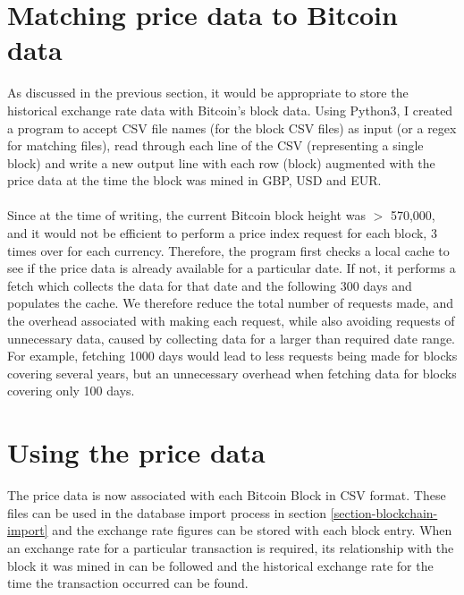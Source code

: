 \section{Matching price data to Bitcoin data}
As discussed in the previous section, it would be appropriate to store the historical exchange rate data with Bitcoin's block data. Using Python3, I created a program to accept CSV file names (for the block CSV files) as input (or a regex for matching files), read through each line of the CSV (representing a single block) and write a new output line with each row (block) augmented with the price data at the time the block was mined in GBP, USD and EUR. 
\\\\
Since at the time of writing, the current Bitcoin block height was $>$ 570,000, and it would not be efficient to perform a price index request for each block, 3 times over for each currency. Therefore, the program first checks a local cache to see if the price data is already available for a particular date. If not, it performs a fetch which collects the data for that date and the following 300 days and populates the cache. We therefore reduce the total number of requests made, and the overhead associated with making each request, while also avoiding requests of unnecessary data, caused by collecting data for a larger than required date range. For example, fetching 1000 days would lead to less requests being made for blocks covering several years, but an unnecessary overhead when fetching data for blocks covering only 100 days.

\section{Using the price data}
The price data is now associated with each Bitcoin Block in CSV format. These files can be used in the database import process in section \ref{section-blockchain-import} and the exchange rate figures can be stored with each block entry. When an exchange rate for a particular transaction is required, its relationship with the block it was mined in can be followed and the historical exchange rate for the time the transaction occurred can be found. 
